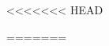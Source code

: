 \documentclass[12pt]{book}
\begin{document}
%    
<<<<<<< HEAD
%         
%         
%         
%         
%         
%         
%         
%         
%         
%         
%         
%         
%         
%         
%         
%         

         


=======
%    
    \pagestyle{fancy}






%        
\end{document}
